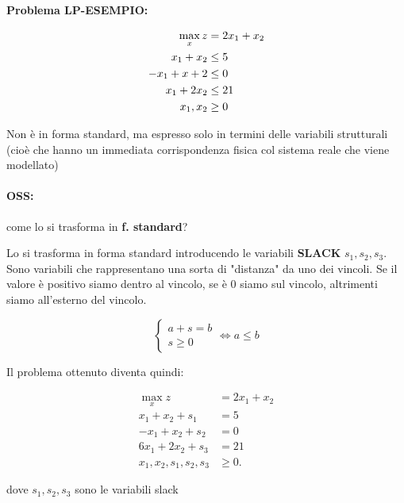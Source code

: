 \documentclass[a4paper, 11pt]{article}
\begin{document}
        \textbf{Problema LP-ESEMPIO: }

        \begin{align}
            \max_{x} z &= 2x_1+x_2 \notag \\
            x_1 + x_2 &\leq 5 \notag \\
            -x_1 + x+2 &\leq 0 \notag \\
            x_1 + 2x_2 &\leq 21 \notag \\
            x_1, x_2 &\geq 0 \notag 
        \end{align}

        Non è in forma standard, ma espresso solo in termini delle variabili strutturali (cioè che hanno un immediata corrispondenza
        fisica col sistema reale che viene modellato)

        \paragraph{OSS: } come lo si trasforma in \textbf{f. standard}? 

        Lo si trasforma in forma standard introducendo le variabili \textbf{SLACK} $s_1, s_2, s_3$. Sono variabili che rappresentano una sorta di "distanza" da uno dei vincoli. Se il valore è positivo siamo dentro al vincolo, se è 0 siamo sul vincolo, altrimenti siamo all'esterno del vincolo.

        \[
            \begin{cases}
                a+s = b \\
                s \geq 0
            \end{cases}
            \iff a \leq b 
        \]            
        
        Il problema ottenuto diventa quindi:



        \begin{align*}
            \max_{x} z &= 2x_1 + x_2 \\
            x_1 + x_2 + s_1 &= 5 \\
            -x_1 + x_2 + s_2 &= 0 \\
            6x_1 + 2x_2 + s_3 &= 21 \\
            x_1, x_2, s_1, s_2, s_3 &\geq 0.
        \end{align*}



        dove $s_1, s_2, s_3$ sono le variabili slack
        
        
\end{document}
